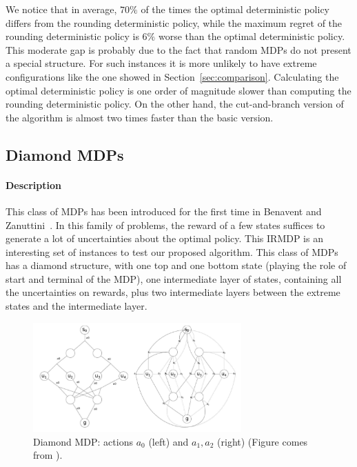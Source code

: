 We notice that in average, $70\%$ of the times the optimal deterministic policy differs from the rounding deterministic policy, while the maximum regret of the rounding deterministic policy is $6\%$ worse than the optimal deterministic policy. This moderate gap is probably due to the fact that random MDPs do not present a special structure. For such instances it is more unlikely to have extreme configurations like the one showed in Section~\ref{sec:comparison}.
Calculating the optimal deterministic policy is one order of magnitude slower than computing the rounding deterministic policy. On the other hand, the cut-and-branch version of the algorithm is almost two times faster than the basic version.  
 

\subsection{Diamond MDPs}
\paragraph{Description}
This class of MDPs has been introduced for the first time in Benavent and Zanuttini~\cite{benavent2018}. 
In this family of problems, the reward of a few states suffices to generate a lot of uncertainties about the optimal policy. This IRMDP is an interesting set of instances to test our proposed algorithm. 
This class of MDPs has a diamond structure, with one top and one bottom state (playing the role of start and terminal of the MDP), one intermediate layer of states, containing all the uncertainties on rewards, plus two intermediate layers between the extreme states and the intermediate layer. 

\begin{figure}[h]
\begin{center}
\includegraphics[width=8cm]{images/diamond.png}
\end{center}
\caption{Diamond MDP: actions $a_0$ (left) and $a_1, a_2$ (right) (Figure comes from \cite{benavent2018}).}
\label{fig:diamond}
\end{figure}

